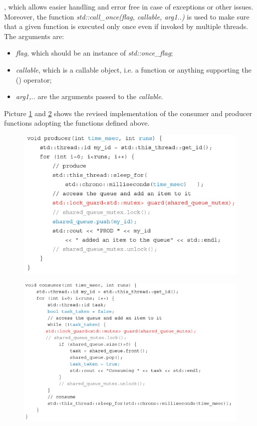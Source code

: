 , which allows easier handling and error free in case of exceptions or other issues. Moreover, the function \textit{std::call\_once(flag, callable, arg1..)} is used to make sure that a given function is executed only once even if invoked by multiple threads. The arguments are:

\begin{itemize}
    \item \textit{flag}, which should be an instance of \textit{std::once\_flag};
    \item \textit{callable}, which is a callable object, i.e. a function or anything supporting the () operator;
    \item \textit{arg1,..} are the arguments passed to the \textit{callable}.
\end{itemize}

Picture \ref{revised_producer} and \ref{revised_consumer} shows the revised implementation of the consumer and producer functions adopting the functions defined above.

\begin{figure}[h!]
		\centering
		\includegraphics[scale = 1.4]{img/cp_revised_p.jpg}
        \label{revised_producer}
\end{figure}

\begin{figure}[h!]
		\centering
		\includegraphics[scale = 1.4]{img/cp_revised_c.jpg}
        \label{revised_consumer}
\end{figure}

